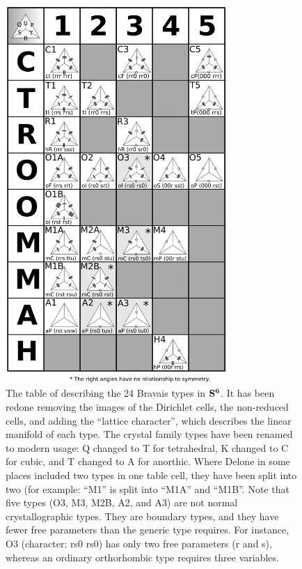 \documentclass[preprint]{iucr}              %
\numberwithin{equation}{section}
\newcommand{\SVI}[0]{$\bf{S^{6}}$}
\begin{document}
	
	\begin{figure}
		\includegraphics[width=0.75\textwidth]{DeloneTypesGrid_3}
		\caption{The table of  describing the 24
			Bravais types in \SVI{}. It has been redone removing the images of the 
			Dirichlet cells, the non-reduced cells, and adding the ``lattice character'', which
			describes the linear manifold of each type. The crystal family types have been
			renamed to modern usage: Q changed to T for tetrahedral, K changed
			to C for cubic, and T changed to A for anorthic. Where Delone
			in some places included two types in one table cell, they have been
			split into two (for example: ``M1'' is split into ``M1A'' and ``M1B''.  Note that five types (O3, M3, M2B, A2, and A3) are not normal 
			crystallographic types. They are boundary types, and they have
			fewer free parameters than the generic type requires. For instance,
			O3 (character: rs0 rs0) has only two free parameters (r and s), whereas
			an ordinary orthorhombic type requires three variables.}
		\label{s6table}		
	\end{figure}
	
\end{document}
